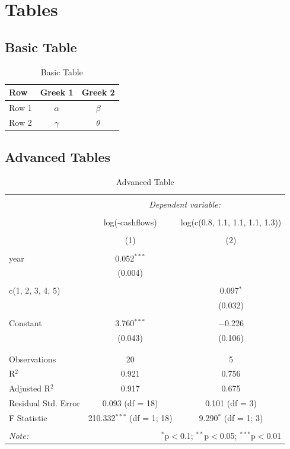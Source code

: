 \documentclass[a4paper, 12pt]{article}
\begin{document}
\section{Tables}
\subsection{Basic Table}
\begin{table}[h]
    \centering
    \label{tab:basic}
    \begin{tabular}{l|cc}
         Row & Greek 1 & Greek 2 \\\hline
         Row 1& $\alpha$ & $\beta$ \\
         Row 2& $\gamma$ & $\theta$
    \end{tabular}
    \caption{Basic Table}
\end{table}

\subsection{Advanced Tables}


\begin{table}[h] \centering 
\label{tab:advanced} 
\begin{tabular}{@{\extracolsep{5pt}}lcc} 
\\[-1.8ex]\hline 
\hline \\[-1.8ex] 
 & \multicolumn{2}{c}{\textit{Dependent variable:}} \\ 
\cline{2-3} 
\\[-1.8ex] & log(-cashflows) & log(c(0.8, 1.1, 1.1, 1.1, 1.3)) \\ 
\\[-1.8ex] & (1) & (2)\\ 
\hline \\[-1.8ex] 
 year & 0.052$^{***}$ &  \\ 
  & (0.004) &  \\ 
  & & \\ 
 c(1, 2, 3, 4, 5) &  & 0.097$^{*}$ \\ 
  &  & (0.032) \\ 
  & & \\ 
 Constant & 3.760$^{***}$ & $-$0.226 \\ 
  & (0.043) & (0.106) \\ 
  & & \\ 
\hline \\[-1.8ex] 
Observations & 20 & 5 \\ 
R$^{2}$ & 0.921 & 0.756 \\ 
Adjusted R$^{2}$ & 0.917 & 0.675 \\ 
Residual Std. Error & 0.093 (df = 18) & 0.101 (df = 3) \\ 
F Statistic & 210.332$^{***}$ (df = 1; 18) & 9.290$^{*}$ (df = 1; 3) \\ 
\hline 
\hline \\[-1.8ex] 
\textit{Note:}  & \multicolumn{2}{r}{$^{*}$p$<$0.1; $^{**}$p$<$0.05; $^{***}$p$<$0.01} \\ 
\end{tabular} 
\caption{Advanced Table} 
\end{table} 
\end{document}
